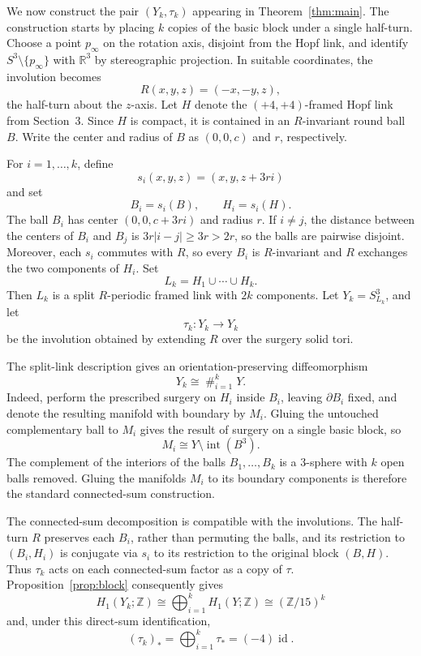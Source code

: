 \documentclass[11pt]{amsart}
\newcommand{\id}{\operatorname{id}}
\newcommand{\Int}{\operatorname{int}}
\newcommand{\Z}{\mathbb{Z}}
\theoremstyle{definition}
\theoremstyle{remark}
\begin{document}
We now construct the pair $(Y_k,\tau_k)$ appearing in Theorem~\ref{thm:main}. The construction starts by placing $k$ copies of the basic block under a single half-turn. Choose a point $p_\infty$ on the rotation axis, disjoint from the Hopf link, and identify $S^3\setminus\{p_\infty\}$ with $\mathbb R^3$ by stereographic projection. In suitable coordinates, the involution becomes
\[
   R(x,y,z)=(-x,-y,z),
\]
the half-turn about the $z$-axis. Let $H$ denote the $(+4,+4)$-framed Hopf link from Section~3. Since $H$ is compact, it is contained in an $R$-invariant round ball $B$. Write the center and radius of $B$ as $(0,0,c)$ and $r$, respectively.

For $i=1,\dots,k$, define
\[
   s_i(x,y,z)=(x,y,z+3ri)
\]
and set
\[
   B_i=s_i(B),
   \qquad
   H_i=s_i(H).
\]
The ball $B_i$ has center $(0,0,c+3ri)$ and radius $r$. If $i\neq j$, the distance between the centers of $B_i$ and $B_j$ is $3r|i-j|\geq3r>2r$, so the balls are pairwise disjoint. Moreover, each $s_i$ commutes with $R$, so every $B_i$ is $R$-invariant and $R$ exchanges the two components of $H_i$. Set
\[
   L_k=H_1\cup\cdots\cup H_k.
\]
Then $L_k$ is a split $R$-periodic framed link with $2k$ components. Let $Y_k=S^3_{L_k}$, and let
\[
   \tau_k\colon Y_k\longrightarrow Y_k
\]
be the involution obtained by extending $R$ over the surgery solid tori.

The split-link description gives an orientation-preserving diffeomorphism
\[
   Y_k\cong\mathop{\#}_{i=1}^kY.
\]
Indeed, perform the prescribed surgery on $H_i$ inside $B_i$, leaving $\partial B_i$ fixed, and denote the resulting manifold with boundary by $M_i$. Gluing the untouched complementary ball to $M_i$ gives the result of surgery on a single basic block, so
\[
   M_i\cong Y\setminus\Int(B^3).
\]
The complement of the interiors of the balls $B_1,\dots,B_k$ is a $3$-sphere with $k$ open balls removed. Gluing the manifolds $M_i$ to its boundary components is therefore the standard connected-sum construction.

The connected-sum decomposition is compatible with the involutions. The half-turn $R$ preserves each $B_i$, rather than permuting the balls, and its restriction to $(B_i,H_i)$ is conjugate via $s_i$ to its restriction to the original block $(B,H)$. Thus $\tau_k$ acts on each connected-sum factor as a copy of $\tau$. Proposition~\ref{prop:block} consequently gives
\[
   H_1(Y_k;\Z)
   \cong\bigoplus_{i=1}^kH_1(Y;\Z)
   \cong(\Z/15)^k
\]
and, under this direct-sum identification,
\[
   (\tau_k)_*
   =\bigoplus_{i=1}^k\tau_*
   =(-4)\id.
\]
\end{document}
